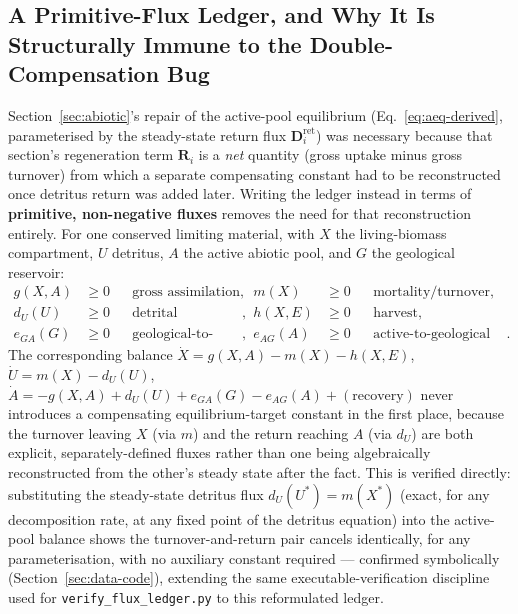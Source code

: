 \documentclass[twocolumn,10pt]{article}
\begin{document}
\subsection{A Primitive-Flux Ledger, and Why It Is Structurally Immune to the Double-Compensation Bug}
\label{sec:unified-ledger}
Section~\ref{sec:abiotic}'s repair of the active-pool equilibrium (Eq.~\eqref{eq:aeq-derived}, parameterised by the steady-state return flux $\mathbf D^{\text{ret}}_i$) was necessary because that section's regeneration term $\mathbf R_i$ is a \emph{net} quantity (gross uptake minus gross turnover) from which a separate compensating constant had to be reconstructed once detritus return was added later. Writing the ledger instead in terms of \textbf{primitive, non-negative fluxes} removes the need for that reconstruction entirely. For one conserved limiting material, with $X$ the living-biomass compartment, $U$ detritus, $A$ the active abiotic pool, and $G$ the geological reservoir:
\[
\begin{aligned}
g(X,A)&\ge0 &&\text{gross assimilation}, & m(X)&\ge0 &&\text{mortality/turnover},\\
d_U(U)&\ge0 &&\text{detrital decomposition}, & h(X,E)&\ge0 &&\text{harvest},\\
e_{GA}(G)&\ge0 &&\text{geological-to-active exchange}, & e_{AG}(A)&\ge0 &&\text{active-to-geological exchange}.
\end{aligned}
\]
The corresponding balance $\dot X = g(X,A)-m(X)-h(X,E)$, $\dot U = m(X)-d_U(U)$, $\dot A = -g(X,A)+d_U(U)+e_{GA}(G)-e_{AG}(A)+(\text{recovery})$ never introduces a compensating equilibrium-target constant in the first place, because the turnover leaving $X$ (via $m$) and the return reaching $A$ (via $d_U$) are both explicit, separately-defined fluxes rather than one being algebraically reconstructed from the other's steady state after the fact. This is verified directly: substituting the steady-state detritus flux $d_U(U^*)=m(X^*)$ (exact, for any decomposition rate, at any fixed point of the detritus equation) into the active-pool balance shows the turnover-and-return pair cancels identically, for any parameterisation, with no auxiliary constant required --- confirmed symbolically (Section~\ref{sec:data-code}), extending the same executable-verification discipline used for \texttt{verify\_flux\_ledger.py} to this reformulated ledger.
\end{document}
